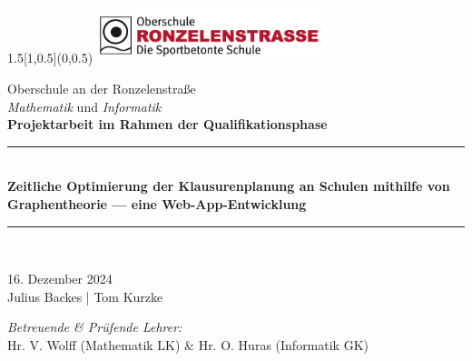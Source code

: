 \begin{titlepage}
\BgThispage
\begin{textblock}{1.5}[1,0.5](0,0.5)
	\includegraphics[width=6.5cm]{docs/logos/logoronzelen.png}\\[3.5cm]
  \end{textblock}
  

  
\bigskip
\bigskip
\begin{center}
{ \large{Oberschule an der Ronzelenstraße\\[0.2cm]
\textit{Mathematik} und \textit{Informatik}}}\\[1cm]

{\large \textbf{Projektarbeit im Rahmen der Qualifikationsphase}}\\[0.6cm]

\rule{\linewidth}{0.5mm} \\[0.1cm]
{ \huge \bfseries Zeitliche Optimierung der Klausurenplanung an Schulen mithilfe von Graphentheorie — eine Web-App-Entwicklung
 \\[0.1cm] }
\rule{\linewidth}{0.5mm} \\[1.5cm]

\noindent

{\large  
    16. Dezember 2024
  } \\[1cm] 

{\Large  
    Julius Backes | Tom Kurzke
  } \\
\vspace{1cm}
\begin{center}
    
\end{center}
\vspace{1cm}

{\textit{Betreuende \& Prüfende Lehrer:}}\\[0.3cm]
 {Hr. V. Wolff (Mathematik LK) \& Hr. O. Huras (Informatik GK)}




\end{center}


\end{titlepage}